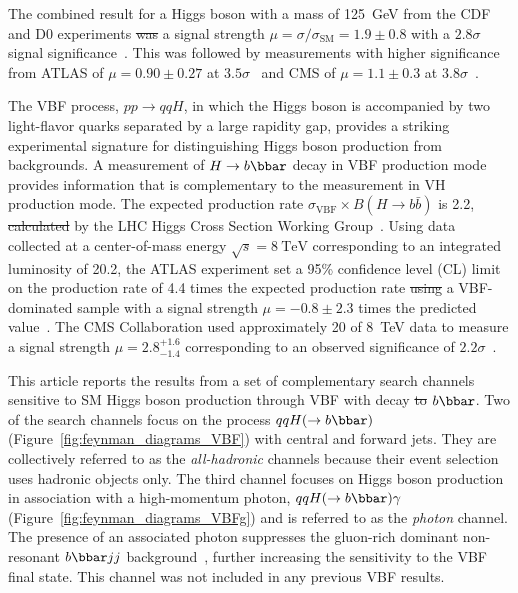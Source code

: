 \documentclass[PAPER, american,coverpage,texlive=2016, english]{\ATLASLATEXPATH atlasdoc}
\providecommand{\DIFadd}[1]{{\protect\color{blue}\uwave{#1}}} %
\providecommand{\DIFdel}[1]{{\protect\color{red}\sout{#1}}}                      %
\providecommand{\DIFaddbegin}{} %
\providecommand{\DIFaddend}{} %
\providecommand{\DIFdelbegin}{} %
\providecommand{\DIFdelend}{} %
\begin{document}
The combined result for a Higgs boson with a mass of \SI{125}{\GeV} from the CDF and D0 experiments \DIFdelbegin \DIFdel{was }\DIFdelend \DIFaddbegin \DIFadd{is }\DIFaddend a signal strength $\mu=\sigma/\sigma_\text{SM}=1.9 \pm 0.8$ with a $2.8\sigma$ signal significance~\cite{Aaltonen:2012qt}.
This was followed by measurements with higher significance from ATLAS of $\mu=0.90 \pm 0.27$ at \DIFdelbegin \DIFdel{$3.5\sigma$}\DIFdelend \DIFaddbegin \DIFadd{$3.6\sigma$}\DIFaddend ~\cite{HIGG-2016-29} and CMS of $\mu=1.1 \pm 0.3$ at $3.8\sigma$~\cite{CMS-HIG-16-044}.

The VBF process, $pp\rightarrow qqH$, in which the Higgs boson is accompanied by two light-flavor quarks separated by a large rapidity gap,
provides a striking experimental signature for distinguishing Higgs boson production from backgrounds.
A measurement of $H\rightarrow b\bbar$ decay in VBF production mode provides information that is complementary to the measurement in VH production mode.
The expected production rate $\sigma_\text{VBF} \times B(H\rightarrow b\bar b)$ is \SI{2.2}{\pb}, \DIFdelbegin \DIFdel{calculated }\DIFdelend \DIFaddbegin \DIFadd{reported }\DIFaddend by the LHC Higgs Cross Section Working Group~\cite{deFlorian:2016spz}.
Using data collected at a center-of-mass energy $\sqrt{s} = \SI{8}{\TeV}$ \DIFaddbegin \DIFadd{and }\DIFaddend corresponding to an integrated luminosity of \SI{20.2}{\ifb}, the ATLAS experiment set a 95\% confidence level (CL) limit on the production rate of 4.4 times the expected production rate \DIFdelbegin \DIFdel{using }\DIFdelend \DIFaddbegin \DIFadd{from }\DIFaddend a VBF-dominated sample with a signal strength $\mu=-0.8 \pm 2.3$ times the predicted value~\cite{HIGG-2014-12}.
The CMS Collaboration used approximately \SI{20}{\ifb} of \SI{8}{\TeV} data to measure a signal strength $\mu = 2.8^{+1.6}_{-1.4}$ corresponding to an observed significance of $2.2\sigma$~\cite{CMS-HIG-14-004}.  

This article reports the results from a set of complementary search channels sensitive to SM Higgs boson production through VBF with decay \DIFdelbegin \DIFdel{to }\DIFdelend \DIFaddbegin \DIFadd{into }\DIFaddend $b\bbar$.
Two of the search channels focus on the process $qqH(\rightarrow b\bbar)$ (Figure~\ref{fig:feynman_diagrams_VBF}) with central and forward jets.
They are collectively referred to as the \textit{all-hadronic} channels because their event selection uses hadronic objects only.
The third channel focuses on Higgs boson production in association with a high-momentum photon, $qqH(\rightarrow b\bbar)\gamma$ (Figure~\ref{fig:feynman_diagrams_VBFg}) and is referred to as the \textit{photon} channel.
The presence of an associated photon suppresses the gluon-rich dominant non-resonant $b\bbar jj$ background~\cite{Gabrielli:2007wf, Gabrielli:2016mdd}, further increasing the sensitivity to the VBF final state.
This channel was not included in any previous VBF results.
\end{document}
